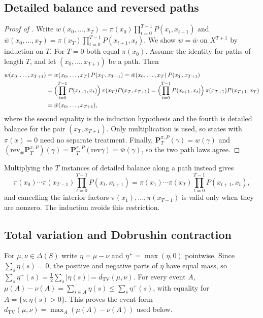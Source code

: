 \documentclass[11pt]{article}
\theoremstyle{definition}
\newcommand{\rev}{\mathrm{rev}}
\newcommand{\1}{\mathbf{1}}
\newcommand{\dTV}{d_{\mathrm{TV}}}
\begin{document}
\subsection{Detailed balance and reversed paths}

\begin{proof}[Proof of ]
Write $w(x_0,\dots,x_T)=\pi(x_0)\prod_{t=0}^{T-1}P(x_t,x_{t+1})$ and $\bar w(x_0,\dots,x_T)=\pi(x_T)\prod_{t=0}^{T-1}P(x_{t+1},x_t)$.
We show $w=\bar w$ on $X^{T+1}$ by induction on $T$.
For $T=0$ both equal $\pi(x_0)$.
Assume the identity for paths of length $T$, and let $(x_0,\dots,x_{T+1})$ be a path.
Then
\begin{align*}
  w(x_0,\dots,x_{T+1})
  &=w(x_0,\dots,x_T)\,P(x_T,x_{T+1})
  =\bar w(x_0,\dots,x_T)\,P(x_T,x_{T+1})\\
  &=\Bigl(\prod_{t=0}^{T-1}P(x_{t+1},x_t)\Bigr)\,\pi(x_T)P(x_T,x_{T+1})
  =\Bigl(\prod_{t=0}^{T-1}P(x_{t+1},x_t)\Bigr)\,\pi(x_{T+1})P(x_{T+1},x_T)\\
  &=\bar w(x_0,\dots,x_{T+1}),
\end{align*}
where the second equality is the induction hypothesis and the fourth is detailed balance for the pair $(x_T,x_{T+1})$.
Only multiplication is used, so states with $\pi(x)=0$ need no separate treatment.
Finally, $\mathbf{P}^{\pi,P}_T(\gamma)=w(\gamma)$ and $(\rev_{\#}\mathbf{P}^{\pi,P}_T)(\gamma)=\mathbf{P}^{\pi,P}_T(\rev\gamma)=\bar w(\gamma)$, so the two path laws agree.
\end{proof}

Multiplying the $T$ instances of detailed balance along a path instead gives
\[
  \pi(x_0)\cdots\pi(x_{T-1})\prod_{t=0}^{T-1}P(x_t,x_{t+1})=\pi(x_1)\cdots\pi(x_T)\prod_{t=0}^{T-1}P(x_{t+1},x_t),
\]
and cancelling the interior factors $\pi(x_1),\dots,\pi(x_{T-1})$ is valid only when they are nonzero.
The induction avoids this restriction.

\subsection{Total variation and Dobrushin contraction}

For $\mu,\nu\in\Delta(S)$ write $\eta=\mu-\nu$ and $\eta^+=\max(\eta,0)$ pointwise.
Since $\sum_s\eta(s)=0$, the positive and negative parts of $\eta$ have equal mass, so $\sum_s\eta^+(s)=\frac12\sum_s|\eta(s)|=\dTV(\mu,\nu)$.
For every event $A$, $\mu(A)-\nu(A)=\sum_{s\in A}\eta(s)\le\sum_s\eta^+(s)$, with equality for $A=\{s:\eta(s)>0\}$.
This proves the event form $\dTV(\mu,\nu)=\max_A(\mu(A)-\nu(A))$ used below.
\end{document}
